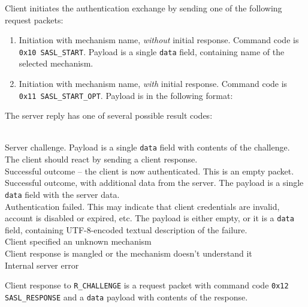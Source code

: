 Client initiates the authentication exchange by sending one of the following request packets:

\begin{enumerate}

\item Initiation with mechanism name, {\it without} initial response. Command code is {\tt 0x10 SASL\_START}.
Payload is a single {\tt data} field, containing name of the selected mechanism.

\item Initiation with mechanism name, {\it with} initial response. Command code is {\tt 0x11 SASL\_START\_OPT}.
Payload is in the following format:

\beginpk
\endpk
\end{enumerate}

The server reply has one of several possible result codes:
\begin{description}
	 \hfill \\
		Server challenge. Payload is a single {\tt data} field with contents of the challenge. The
		client should react by sending a client response.
	 \hfill \\
		Successful outcome -- the client is now authenticated. This is an empty packet.
	 \hfill \\
		Successful outcome, with additional data from the server. The payload is a single {\tt data}
		field with the server data.
	 \hfill \\
		Authentication failed. This may indicate that client credentials are invalid, account is
		disabled or expired, etc. The payload is either empty, or it is a {\tt data} field, containing
		UTF-8-encoded textual description of the failure.
	 \hfill \\
		Client specified an unknown mechanism
	 \hfill \\
		Client response is mangled or the mechanism doesn't understand it
	 \hfill \\
		Internal server error
\end{description}

Client response to {\tt R\_CHALLENGE} is a request packet with command code {\tt 0x12 SASL\_RESPONSE} and
a {\tt data} payload with contents of the response.

